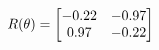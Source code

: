\documentclass[preview]{standalone}
\begin{document}
\begin{align*}
\special{dvisvgm:raw <g id='unique000'>}R(\theta) = \begin{bmatrix}-0.22 & -0.97\\0.97 & -0.22\end{bmatrix}\special{dvisvgm:raw </g>}
\end{align*}
\end{document}

